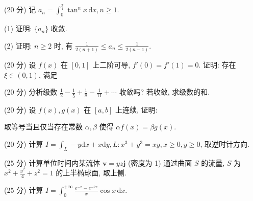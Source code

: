 \par{}
(20 分) 记 $a_{n} = \int_{0}^{\frac{\pi}{4}} \tan^{n} x \, \mathrm{d}x, n \geq 1$.\par
(1) 证明: $\{a_{n}\}$ 收敛.\par
(2) 证明: $n \geq 2$ 时, 有 $\frac{1}{2(n + 1)} \leq a_n \leq \frac{1}{2(n - 1)}$.\par
\par{}
\par{}
(20 分) 设 $f(x)$ 在 $[0,1]$ 上二阶可导, $f'(0) = f'(1) = 0$. 证明: 存在 $\xi \in (0,1)$, 满足\par
\nopagebreak[4]
\par{}
(20 分) 分析级数 $\frac{1}{2} - \frac{1}{5} + \frac{1}{8} - \frac{1}{11} + \cdots$ 收敛吗? 若收敛, 求级数的和.\par
\par{}
\par{}
(20 分) 设 $f(x), g(x)$ 在 $[a, b]$ 上连续, 证明:\par
\nopagebreak[4]
取等号当且仅当存在常数 $\alpha, \beta$ 使得 $\alpha f(x) = \beta g(x)$.\par
\par{}
(20 分) 计算 $I = \int_{L} -y\mathrm{d}x + x\mathrm{d}y, L: x^{3} + y^{3} = xy, x \geq 0, y \geq 0$, 取逆时针方向.\par
\par{}
(25 分) 计算单位时间内某流体 $\boldsymbol{v} = yz\boldsymbol{j}$ (密度为 1) 通过曲面 $S$ 的流量, $S$ 为 $x^{2} + \frac{y^{2}}{4} + z^{2} = 1$ 的上半椭球面, 取上侧.\par
\par{}
(25 分) 计算 $I = \int_{0}^{+\infty} \frac{e^{-x} - e^{-2x}}{x} \cos x \, \mathrm{d}x$.\par
